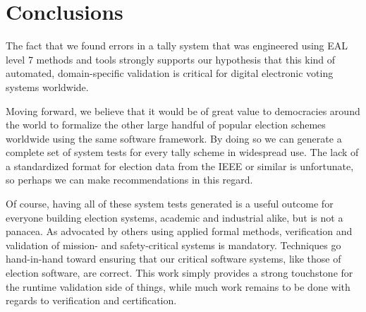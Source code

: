 \documentclass[runningheads,a4paper]{llncs}
\begin{document}
\section{Conclusions}
\label{sec:results-concl-future}

The fact that we found errors in a tally system that was engineered
using EAL level 7 methods and tools strongly supports our hypothesis
that this kind of automated, domain-specific validation is critical
for digital electronic voting systems worldwide.

Moving forward, we believe that it would be of great value to
democracies around the world to formalize the other large handful of
popular election schemes worldwide using the same software framework.
By doing so we can generate a complete set of system tests for every
tally scheme in widespread use.  The lack of a standardized format for
election data from the IEEE or similar is unfortunate, so perhaps we
can make recommendations in this regard.

Of course, having all of these system tests generated is a useful
outcome for everyone building election systems, academic and
industrial alike, but is not a panacea.  As advocated by others using
applied formal methods, verification and validation of mission- and
safety-critical systems is mandatory.  Techniques go hand-in-hand
toward ensuring that our critical software systems, like those of
election software, are correct.  This work simply provides a strong
touchstone for the runtime validation side of things, while much work
remains to be done with regards to verification and certification.






\appendix
\end{document}
